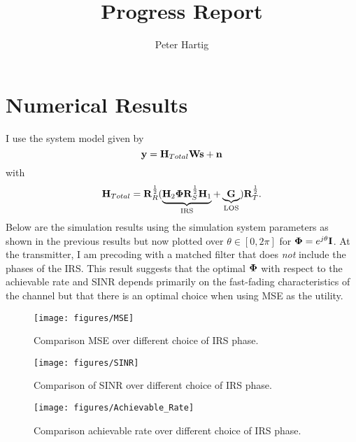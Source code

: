 \documentclass[12pt,a4paper]{report}
\title{Progress Report}
\author{Peter Hartig}
\begin{document}
\maketitle
\tableofcontents

\section{Numerical Results}
I use the system model given by 
\begin{equation}
\mathbf{y} = \mathbf{H}_{Total} \mathbf{W} \mathbf{s}  + \mathbf{n}
\end{equation}
with 
	\begin{equation}
	\mathbf{H}_{Total} = \mathbf{R}_{R}^{\frac{1}{2}}(\underbrace{\mathbf{H}_{2}\boldsymbol{\Phi}\mathbf{R}_{S}^{\frac{1}{2}}\mathbf{H}_{1}}_{\text{IRS}} + \underbrace{\mathbf{G}}_{\text{LOS}})\mathbf{R}_{T}^{\frac{1}{2}}.
	\end{equation}
Below are the simulation results using the simulation system parameters as shown in the previous results but now plotted over $\theta \in [0, 2\pi]$ for $\boldsymbol{\Phi} = e^{j\theta}\mathbf{I}$. At the transmitter, I am precoding with a matched filter that does \emph{not} include the phases of the IRS. 
This result suggests that the optimal $\boldsymbol{\Phi}$ with respect to the achievable rate and SINR depends  primarily on the fast-fading characteristics of the channel but that there is an optimal choice when using MSE as the utility.
		\begin{figure}[H]
	\texttt{[image: figures/MSE]}
	  \caption{Comparison MSE over different choice of IRS phase.}
	  	  \label{MSE_correlation}
	\end{figure} 
	
			\begin{figure}[H]
	\texttt{[image: figures/SINR]}
	  \caption{Comparison of SINR over different choice of IRS phase.}
	  	  \label{SINR}
	\end{figure} 
	
			\begin{figure}[H]
	\texttt{[image: figures/Achievable\_Rate]}
	  \caption{Comparison achievable rate over different choice of IRS phase.}
	  	  \label{Achievable_rate}
	\end{figure} 
\end{document}
